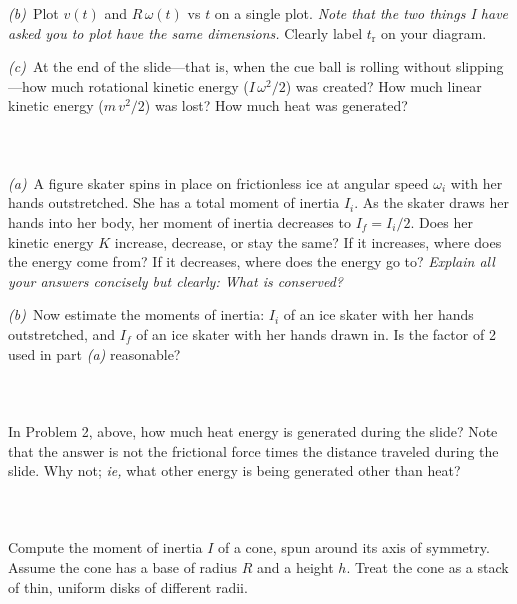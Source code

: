 \documentclass[12pt]{article}
\newcounter{problem}
\begin{document}
\textsl{(b)}~Plot $v(t)$ and $R\,\omega(t)$ vs $t$ on a single plot.
\emph{Note that the two things I have asked you to plot have the same
dimensions.}  Clearly label $t_\mathrm{r}$ on your diagram.

\textsl{(c)}~At the end of the slide---that is, when the cue ball is
rolling without slipping---how much rotational kinetic energy
($I\,\omega^2 / 2$) was created? How much linear kinetic energy
($m\,v^2 / 2$) was lost? How much heat was generated?

\paragraph{\problemname~\theproblem}

\textsl{(a)}~A figure skater spins in place on frictionless ice at
angular speed $\omega_i$ with her hands outstretched.  She has a total
moment of inertia $I_i$.  As the skater draws her hands into her body,
her moment of inertia decreases to $I_f=I_i/2$.  Does her kinetic
energy $K$ increase, decrease, or stay the same?  If it increases,
where does the energy come from?  If it decreases, where does the
energy go to?  \emph{Explain all your answers concisely but clearly:
What is conserved?}

\textsl{(b)}~Now estimate the moments of inertia: $I_i$ of an ice
skater with her hands outstretched, and $I_f$ of an ice skater with
her hands drawn in.  Is the factor of 2 used in part \textsl{(a)}
reasonable?

\paragraph{\problemname~\theproblem}

In Problem 2, above, how much heat energy is generated during the
slide?  Note that the answer is not the frictional force times the
distance traveled during the slide.  Why not; \textit{ie,} what other
energy is being generated other than heat?

\paragraph{\problemname~\theproblem}

Compute the moment of inertia $I$ of a cone, spun around its axis of
symmetry.  Assume the cone has a base of radius $R$ and a height $h$.
Treat the cone as a stack of thin, uniform disks of different radii.
\end{document}
